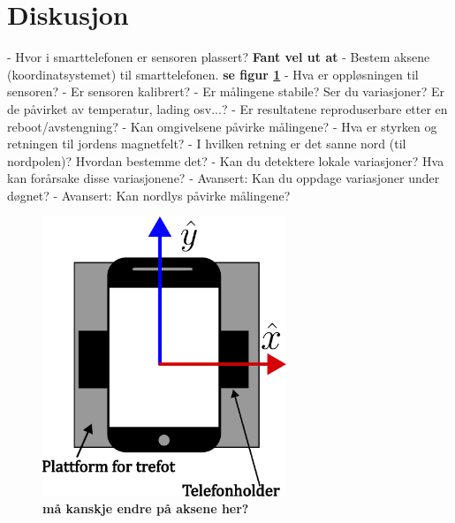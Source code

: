 \section{Diskusjon}

- Hvor i smarttelefonen er sensoren plassert?  \textbf{Fant vel ut at } \newline 
- Bestem aksene (koordinatsystemet) til smarttelefonen. \textbf{se figur \ref{fig:telf_akser} }\newline 
- Hva er oppløsningen til sensoren? \newline
- Er sensoren kalibrert? \newline
- Er målingene stabile? Ser du variasjoner? Er de påvirket av temperatur, lading
osv...? \newline
- Er resultatene reproduserbare etter en reboot/avstengning? \newline
- Kan omgivelsene påvirke målingene?  \newline
- Hva er styrken og retningen til jordens magnetfelt?  \newline
- I hvilken retning er det sanne nord (til nordpolen)? Hvordan bestemme det? \newline
- Kan du detektere lokale variasjoner? Hva kan forårsake disse variasjonene?  \newline
- Avansert: Kan du oppdage variasjoner under døgnet? \newline
- Avansert: Kan nordlys påvirke målingene? \newline

\begin{figure}
    \centering
    \includegraphics[width=0.65\textwidth]{img/Plattform med telefoni.pdf}
    \caption{\textbf{må kanskje endre på aksene her?} 
        }
    \label{fig:telf_akser}
\end{figure}